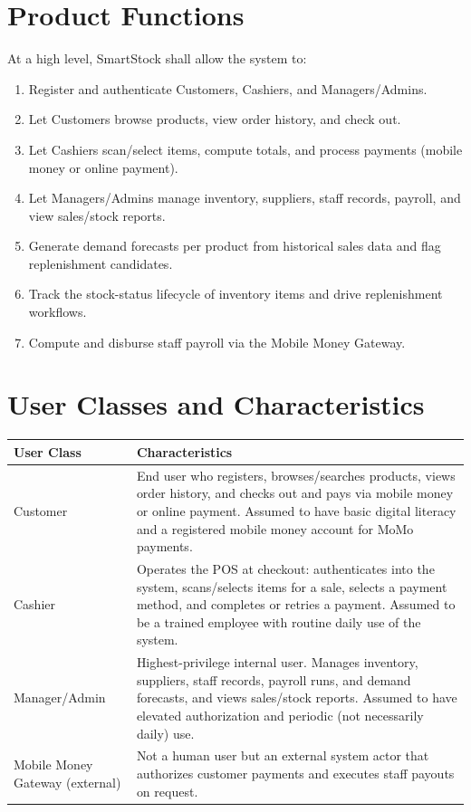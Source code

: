 \documentclass[11pt,a4paper]{report}
\begin{document}
\section{Product Functions}
At a high level, SmartStock shall allow the system to:
\begin{enumerate}[itemsep=2pt]
    \item Register and authenticate Customers, Cashiers, and Managers/Admins.
    \item Let Customers browse products, view order history, and check out.
    \item Let Cashiers scan/select items, compute totals, and process payments (mobile money or online payment).
    \item Let Managers/Admins manage inventory, suppliers, staff records, payroll, and view sales/stock reports.
    \item Generate demand forecasts per product from historical sales data and flag replenishment candidates.
    \item Track the stock-status lifecycle of inventory items and drive replenishment workflows.
    \item Compute and disburse staff payroll via the Mobile Money Gateway.
\end{enumerate}

\section{User Classes and Characteristics}
\begin{longtable}{L{2.7cm} L{11.3cm}}
\toprule
\textbf{User Class} & \textbf{Characteristics} \\
\midrule
\endhead
Customer & End user who registers, browses/searches products, views order history, and checks out and pays via mobile money or online payment. Assumed to have basic digital literacy and a registered mobile money account for MoMo payments. \\
Cashier & Operates the POS at checkout: authenticates into the system, scans/selects items for a sale, selects a payment method, and completes or retries a payment. Assumed to be a trained employee with routine daily use of the system. \\
Manager/Admin & Highest-privilege internal user. Manages inventory, suppliers, staff records, payroll runs, and demand forecasts, and views sales/stock reports. Assumed to have elevated authorization and periodic (not necessarily daily) use. \\
Mobile Money Gateway (external) & Not a human user but an external system actor that authorizes customer payments and executes staff payouts on request. \\
\bottomrule
\end{longtable}
\end{document}
